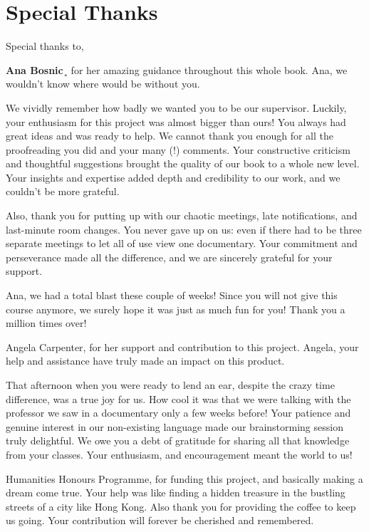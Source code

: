 \section{Special Thanks}

Special thanks to, 

{\bf Ana Bosnic}¸ for her amazing guidance throughout this whole book. Ana, we wouldn’t know where would be without you. 

We vividly remember how badly we wanted you to be our supervisor. Luckily, your enthusiasm for this project was almost bigger than ours! You always had great ideas and was ready to help. We cannot thank you enough for all the proofreading you did and your many (!) comments. Your constructive criticism and thoughtful suggestions brought the quality of our book to a whole new level. Your insights and expertise added depth and credibility to our work, and we couldn’t be more grateful.  

Also, thank you for putting up with our chaotic meetings, late notifications, and last-minute room changes. You never gave up on us: even if there had to be three separate meetings to let all of use view one documentary. Your commitment and perseverance made all the difference, and we are sincerely grateful for your support. 

Ana, we had a total blast these couple of weeks! Since you will not give this course anymore, we surely hope it was just as much fun for you! Thank you a million times over! 

  

Angela Carpenter, for her support and contribution to this project. Angela, your help and assistance have truly made an impact on this product.  

That afternoon when you were ready to lend an ear, despite the crazy time difference, was a true joy for us. How cool it was that we were talking with the professor we saw in a documentary only a few weeks before! Your patience and genuine interest in our non-existing language made our brainstorming session truly delightful. We owe you a debt of gratitude for sharing all that knowledge from your classes. Your enthusiasm, and encouragement meant the world to us! 

 

Humanities Honours Programme, for funding this project,  and basically making a dream come true. Your help was like finding a hidden treasure in the bustling streets of a city like Hong Kong. Also thank you for providing the coffee to keep us going. Your contribution will forever be cherished and remembered.
